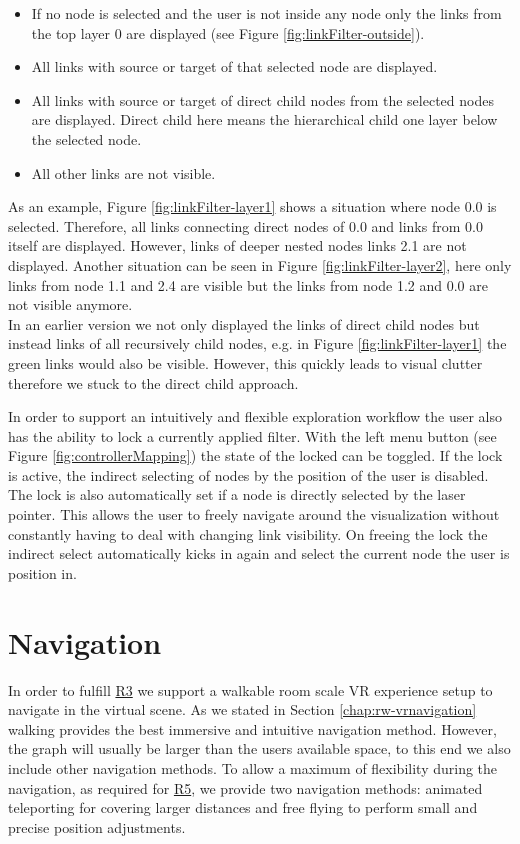 \begin{itemize}
    \item If no node is selected and the user is not inside any node only the links from the top layer 0 are displayed (see Figure \ref{fig:linkFilter-outside}).
    \item All links with source or target of that selected node are displayed. 
    \item All links with source or target of direct child nodes from the selected nodes are displayed. Direct child here means the hierarchical child one layer below the selected node. 
    \item All other links are not visible.
\end{itemize}

As an example, Figure \ref{fig:linkFilter-layer1} shows a situation where node 0.0 is selected. Therefore, all links connecting direct nodes of 0.0 and links from 0.0 itself are displayed. However, links of deeper nested nodes links 2.1 are not displayed. 
Another situation can be seen in Figure \ref{fig:linkFilter-layer2}, here only links from node 1.1 and 2.4 are visible but the links from node 1.2 and 0.0 are not visible anymore.\\
In an earlier version we not only displayed the links of direct child nodes but instead links of all recursively child nodes, e.g. in Figure \ref{fig:linkFilter-layer1} the green links would also be visible. However, this quickly leads to visual clutter therefore we stuck to the direct child approach.

In order to support an intuitively and flexible exploration workflow the user also has the ability to lock a currently applied filter.
With the left menu button (see Figure \ref{fig:controllerMapping}) the state of the locked can be toggled. 
If the lock is active, the indirect selecting of nodes by the position of the user is disabled. The lock is also automatically set if a node is directly selected by the laser pointer. 
This allows the user to freely navigate around the visualization without constantly having to deal with changing link visibility. 
On freeing the lock the indirect select automatically kicks in again and select the current node the user is position in.

\section{Navigation}
\label{chap:solution-navigation}
In order to fulfill \hyperref[req:R3]{R3} we support a walkable room scale VR experience setup to navigate in the virtual scene. As we stated in Section \ref{chap:rw-vrnavigation} walking provides the best immersive and intuitive navigation method.
However, the graph will usually be larger than the users available space, to this end we also include other navigation methods.
To allow a maximum of flexibility during the navigation, as required for \hyperref[req:R5]{R5}, we provide two navigation methods: animated teleporting for covering larger distances and free flying to perform small and precise position adjustments.

